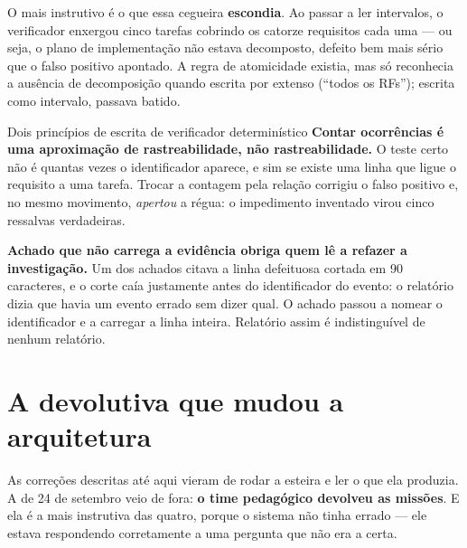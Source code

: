 \documentclass[11pt,a4paper]{article}
\begin{document}
O mais instrutivo é o que essa cegueira \textbf{escondia}. Ao passar a ler intervalos, o verificador enxergou cinco tarefas cobrindo os catorze requisitos cada uma --- ou seja, o plano de implementação não estava decomposto, defeito bem mais sério que o falso positivo apontado. A regra de atomicidade existia, mas só reconhecia a ausência de decomposição quando escrita por extenso (``todos os RFs''); escrita como intervalo, passava batido.

\begin{caixaPratica}{Dois princípios de escrita de verificador determinístico}
\textbf{Contar ocorrências é uma aproximação de rastreabilidade, não rastreabilidade.} O teste certo não é quantas vezes o identificador aparece, e sim se existe uma linha que ligue o requisito a uma tarefa. Trocar a contagem pela relação corrigiu o falso positivo e, no mesmo movimento, \emph{apertou} a régua: o impedimento inventado virou cinco ressalvas verdadeiras.

\textbf{Achado que não carrega a evidência obriga quem lê a refazer a investigação.} Um dos achados citava a linha defeituosa cortada em 90 caracteres, e o corte caía justamente antes do identificador do evento: o relatório dizia que havia um evento errado sem dizer qual. O achado passou a nomear o identificador e a carregar a linha inteira. Relatório assim é indistinguível de nenhum relatório.
\end{caixaPratica}

\section{A devolutiva que mudou a arquitetura}

As correções descritas até aqui vieram de rodar a esteira e ler o que ela produzia. A de 24 de setembro veio de fora: \textbf{o time pedagógico devolveu as missões}. E ela é a mais instrutiva das quatro, porque o sistema não tinha errado --- ele estava respondendo corretamente a uma pergunta que não era a certa.
\end{document}
